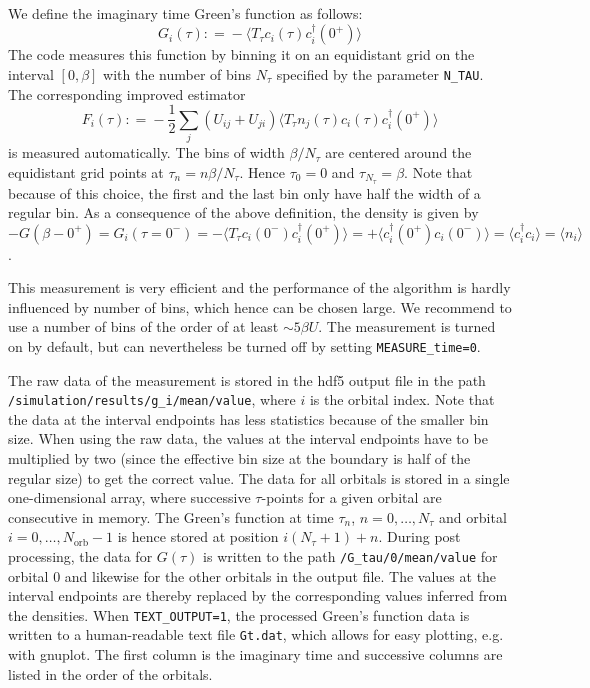 \documentclass[aps,prb,floatfix,superscriptaddress,twocolumn,notitlepage]{revtex4-1}
\newcommand\Let{\mathrel{\mathop:\!\!=}}
\begin{document}
We define the imaginary time Green's function as follows:
\begin{equation}
G_{i}(\tau) \Let -\langle T_{\tau}c_{i}(\tau)c_{i}^{\dagger}(0^{+})\rangle
\label{Gtdef}
\end{equation}
The code measures this function by binning it on an equidistant grid on the interval $[0,\beta]$ with the number of bins $N_{\tau}$ specified by the parameter \verb#N_TAU#. The corresponding improved estimator
\begin{equation}
F_{i}(\tau) \Let -\frac{1}{2}\sum_{j}(U_{ij}+U_{ji})\langle T_{\tau}n_{j}(\tau)c_{i}(\tau)c_{i}^{\dagger}(0^{+})\rangle
\label{Ftdef}
\end{equation}
is measured automatically.
The bins of width $\beta/N_{\tau}$ are centered around the equidistant grid points at $\tau_{n}=n\beta/N_{\tau}$. Hence $\tau_{0}=0$ and $\tau_{N_{\tau}}=\beta$. Note that because of this choice, the first and the last bin only have half the width of a regular bin.
As a consequence of the above definition, the density is given by
$-G(\beta-0^{+})=G_{i}(\tau=0^{-})=-\langle T_{\tau} c_{i}(0^{-})c_{i}^{\dagger}(0^{+})\rangle = +\langle c_{i}^{\dagger}(0^{+}) c_{i}(0^{-})\rangle =\langle c_{i}^{\dagger} c_{i}\rangle = \langle n_{i} \rangle$.

This measurement is very efficient and the performance of the algorithm is hardly influenced by number of bins, which hence can be chosen large. We recommend to use a number of bins of the order of at least $\sim 5\beta U$. The measurement is turned on by default, but can nevertheless be turned off by setting \verb#MEASURE_time=0#.

The raw data of the measurement is stored in the hdf5 output file in the path \verb#/simulation/results/g_i/mean/value#, where $i$ is the orbital index. Note that the data at the interval endpoints has less statistics because of the smaller bin size. When using the raw data, the values at the interval endpoints have to be multiplied by two (since the effective bin size at the boundary is half of the regular size) to get the correct value. The data for all orbitals is stored in a single one-dimensional array, where successive $\tau$-points for a given orbital are consecutive in memory. The Green's function at time $\tau_{n}$, $n=0,\ldots,N_{\tau}$ and orbital $i=0,\ldots,N_{\text{orb}}-1$ is hence stored at position $i(N_{\tau}+1)+n$.
During post processing, the data for $G(\tau)$ is written to the path \verb#/G_tau/0/mean/value# for orbital $0$ and likewise for the other orbitals in the output file. The values at the interval endpoints are thereby replaced by the corresponding values inferred from the densities.
When \verb#TEXT_OUTPUT=1#, the processed Green's function data is written to a human-readable text file \verb#Gt.dat#, which allows for easy plotting, e.g. with gnuplot. The first column is the imaginary time and successive columns are listed in the order of the orbitals.
\end{document}
